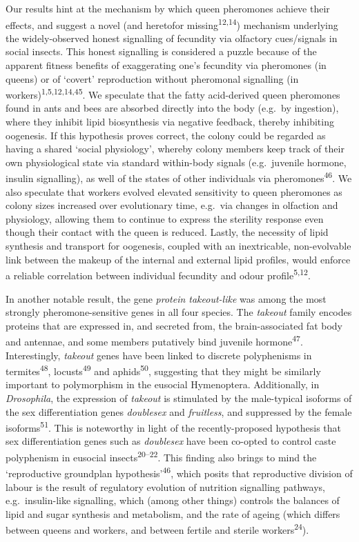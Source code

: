 \documentclass[12pt,]{article}
\begin{document}
Our results hint at the mechanism by which queen pheromones achieve
their effects, and suggest a novel (and heretofor
missing\textsuperscript{12,14}) mechanism underlying the widely-observed
honest signalling of fecundity via olfactory cues/signals in social
insects. This honest signalling is considered a puzzle because of the
apparent fitness benefits of exaggerating one's fecundity via pheromones
(in queens) or of `covert' reproduction without pheromonal signalling
(in workers)\textsuperscript{1,5,12,14,45}. We speculate that the fatty
acid-derived queen pheromones found in ants and bees are absorbed
directly into the body (e.g.~by ingestion), where they inhibit lipid
biosynthesis via negative feedback, thereby inhibiting oogenesis. If
this hypothesis proves correct, the colony could be regarded as having a
shared `social physiology', whereby colony members keep track of their
own physiological state via standard within-body signals (e.g.~juvenile
hormone, insulin signalling), as well of the states of other individuals
via pheromones\textsuperscript{46}. We also speculate that workers
evolved elevated sensitivity to queen pheromones as colony sizes
increased over evolutionary time, e.g.~via changes in olfaction and
physiology, allowing them to continue to express the sterility response
even though their contact with the queen is reduced. Lastly, the
necessity of lipid synthesis and transport for oogenesis, coupled with
an inextricable, non-evolvable link between the makeup of the internal
and external lipid profiles, would enforce a reliable correlation
between individual fecundity and odour profile\textsuperscript{5,12}.

In another notable result, the gene \emph{protein takeout-like} was
among the most strongly pheromone-sensitive genes in all four species.
The \emph{takeout} family encodes proteins that are expressed in, and
secreted from, the brain-associated fat body and antennae, and some
members putatively bind juvenile hormone\textsuperscript{47}.
Interestingly, \emph{takeout} genes have been linked to discrete
polyphenisms in termites\textsuperscript{48},
locusts\textsuperscript{49} and aphids\textsuperscript{50}, suggesting
that they might be similarly important to polymorphism in the eusocial
Hymenoptera. Additionally, in \emph{Drosophila}, the expression of
\emph{takeout} is stimulated by the male-typical isoforms of the sex
differentiation genes \emph{doublesex} and \emph{fruitless}, and
suppressed by the female isoforms\textsuperscript{51}. This is
noteworthy in light of the recently-proposed hypothesis that sex
differentiation genes such as \emph{doublesex} have been co-opted to
control caste polyphenism in eusocial insects\textsuperscript{20--22}.
This finding also brings to mind the `reproductive groundplan
hypothesis'\textsuperscript{46}, which posits that reproductive division
of labour is the result of regulatory evolution of nutrition signalling
pathways, e.g.~insulin-like signalling, which (among other things)
controls the balances of lipid and sugar synthesis and metabolism, and
the rate of ageing (which differs between queens and workers, and
between fertile and sterile workers\textsuperscript{24}).
\end{document}
